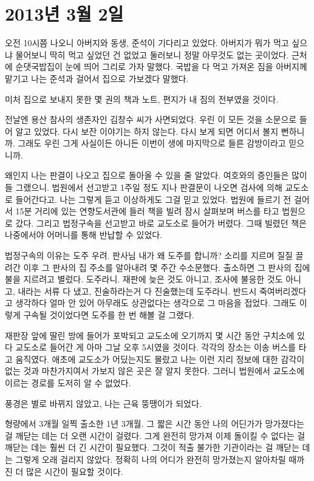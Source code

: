 \begin{article}
\hypertarget{uxb144-3uxc6d4-2uxc77c}{%
\chapter{2013년 3월 2일}\label{uxb144-3uxc6d4-2uxc77c}}

오전 10시쯤 나오니 아버지와 동생, 준석이 기다리고 있었다. 아버지가 뭐가 먹고 싶으냐 물어보니 딱히 먹고 싶었던 건 없었고 둘러보니 정말 아무것도 없는 곳이었다. 근처에 순댓국밥집이 눈에 띄어 그리로 가자 말했다. 국밥을 다 먹고 가져온 짐을 아버지께 맡기고 나는 준석과 걸어서 집으로 가보겠다 말했다.

미처 집으로 보내지 못한 몇 권의 책과 노트, 편지가 내 짐의 전부였을 것이다.

전날엔 용산 참사의 생존자인 김창수 씨가 사면되었다. 우린 이 모든 것을 소문으로 들어 알고 있었다. 다시 보잔 이야기는 하지 않는다. 다시 보게 되면 어디서 볼지 뻔하니까. 그래도 우린 그게 사실이든 아니든 이번이 생에 마지막으로 들른 감방이라고 믿으니까.

왜인지 나는 판결이 나오고 집으로 돌아올 수 있을 줄 알았다. 여호와의 증인들은 많이들 그랬으니. 법원에서 선고받고 1주일 정도 지나 판결문이 나오면 검사에 의해 교도소로 들어간다고. 나는 그렇게 듣고 이상하게도 그걸 믿고 있었다. 법원에 들르기 전 걸어서 15분 거리에 있는 연향도서관에 들러 책을 빌려 잠시 살펴보며 버스를 타고 법원으로 갔다. 그리고 법정구속을 선고받고 바로 교도소로 들어가 버렸다. 그때 빌렸던 책은 나중에서야 어머니를 통해 반납할 수 있었다.

법정구속의 이유는 도주 우려. 판사님 내가 왜 도주를 합니까? 소리를 지르며 질질 끌려간 이후 그 판사의 집 주소를 알아내려 몇 주간 수소문했다. 출소하면 그 판사의 집에 불을 지르려고 별렀다. 도주라니. 재판에 늦은 것도 아니고, 조사에 불응한 것도 아니고, 내라는 서류 다 냈고, 진술하라는거 다 진술했는데 도주라니. 반드시 죽여버리겠다고 생각하다 얼마 안 있어 아무래도 상관없다는 생각으로 그 마음을 접었다. 그래도 이렇게 구속될 것이었다면 도주를 한 번 해볼 걸 그랬다.

재판장 앞에 딸린 방에 들어가 포박되고 교도소에 오기까지 몇 시간 동안 구치소에 있다 교도소로 들어간 게 아마 그날 오후 5시였을 것이다. 각각의 장소는 이송 버스를 타고 움직였다. 애초에 교도소가 어딨는지도 몰랐고 나는 이런 지리 정보에 대한 감각이 없는 것과 마찬가지여서 가보지 않은 곳은 잘 알지 못한다. 그러니 법원에서 교도소에 이르는 경로를 도저히 알 수 없었다.

풍경은 별로 바뀌지 않았고, 나는 근육 뚱땡이가 되었다.

형량에서 3개월 일찍 출소한 1년 3개월. 그 짧은 시간 동안 나의 어딘가가 망가졌다는 걸 깨닫는 데는 더 오랜 시간이 걸렸다. 그게 완전히 망가져 이제 돌이킬 수 없다는 걸 깨닫는 데는 훨씬 더 긴 시간이 필요했다. 그것이 적출 불가한 기관이라는 걸 깨닫는 데는 그렇게 오래 걸리지 않았다. 정확히 나의 어디가 완전히 망가졌는지 알아차릴 때까진 더 많은 시간이 필요할 것이다.


\end{article}
